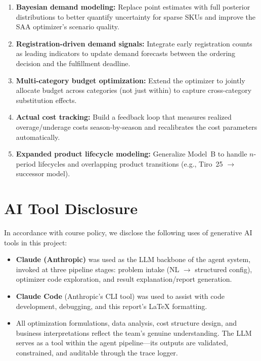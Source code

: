 \documentclass[11pt, letterpaper]{article}
\begin{document}
\begin{enumerate}
    \item \textbf{Bayesian demand modeling:} Replace point estimates with full posterior distributions to better quantify uncertainty for sparse SKUs and improve the SAA optimizer's scenario quality.

    \item \textbf{Registration-driven demand signals:} Integrate early registration counts as leading indicators to update demand forecasts between the ordering decision and the fulfillment deadline.

    \item \textbf{Multi-category budget optimization:} Extend the optimizer to jointly allocate budget across categories (not just within) to capture cross-category substitution effects.

    \item \textbf{Actual cost tracking:} Build a feedback loop that measures realized overage/underage costs season-by-season and recalibrates the cost parameters automatically.

    \item \textbf{Expanded product lifecycle modeling:} Generalize Model~B to handle $n$-period lifecycles and overlapping product transitions (e.g., Tiro~25 $\to$ successor model).
\end{enumerate}

\section{AI Tool Disclosure}

In accordance with course policy, we disclose the following uses of generative AI tools in this project:

\begin{itemize}
    \item \textbf{Claude (Anthropic)} was used as the LLM backbone of the agent system, invoked at three pipeline stages: problem intake (NL $\to$ structured config), optimizer code exploration, and result explanation/report generation.
    \item \textbf{Claude Code} (Anthropic's CLI tool) was used to assist with code development, debugging, and this report's \LaTeX{} formatting.
    \item All optimization formulations, data analysis, cost structure design, and business interpretations reflect the team's genuine understanding. The LLM serves as a tool within the agent pipeline---its outputs are validated, constrained, and auditable through the trace logger.
\end{itemize}

\end{document}
